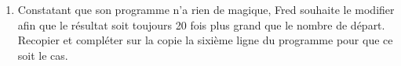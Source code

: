 \documentclass[exercice,a4]{thedocument}%
\begin{document}
\begin{scratch}[scale=0.8,baseline=4]
\end{scratch}
	\hfill
	\begin{minipage}{0.6\linewidth}
		\begin{enumerate}[start=6]
		\item Constatant que son programme n'a rien de magique, Fred souhaite le modifier afin que le résultat soit toujours 20 fois plus grand que le nombre de départ. Recopier et compléter sur la copie la sixième ligne du programme pour que ce soit le cas.
	\end{enumerate}
	\end{minipage}

\bigskip
\showthesource
\end{document}
